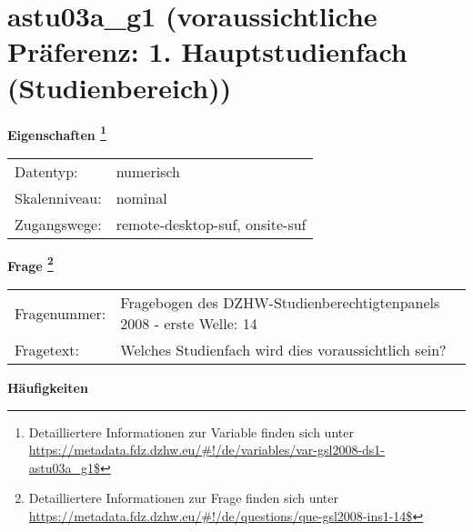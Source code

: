 
    \setcounter{footnote}{0}

    \vspace*{-1.8cm}
	\section{astu03a\_g1 (voraussichtliche Präferenz: 1. Hauptstudienfach (Studienbereich))}
	\label{section:astu03a_g1}



    \vspace*{0.5cm}
    \noindent\textbf{Eigenschaften
	\footnote{Detailliertere Informationen zur Variable finden sich unter
		\url{https://metadata.fdz.dzhw.eu/\#!/de/variables/var-gsl2008-ds1-astu03a_g1$}}}\\
	\begin{tabularx}{\hsize}{@{}lX}
	Datentyp: & numerisch \\
	Skalenniveau: & nominal \\
	Zugangswege: &
	  remote-desktop-suf, 
	  onsite-suf
 \\
    \end{tabularx}



				\vspace*{0.5cm}
                \noindent\textbf{Frage
	                \footnote{Detailliertere Informationen zur Frage finden sich unter
		              \url{https://metadata.fdz.dzhw.eu/\#!/de/questions/que-gsl2008-ins1-14$}}}\\
				\begin{tabularx}{\hsize}{@{}lX}
					Fragenummer: &
					  Fragebogen des DZHW-Studienberechtigtenpanels 2008 - erste Welle:
					  14
 \\
					Fragetext: & Welches Studienfach wird dies voraussichtlich sein? \\
				\end{tabularx}





        		\vspace*{0.5cm}
                \noindent\textbf{Häufigkeiten}

